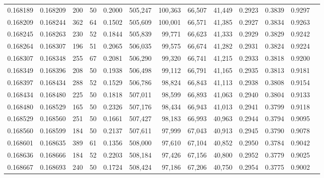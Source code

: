 \begin{tabular}{rrrrrrrrrrrrr}
0.168189 & 0.168209 &   200 &  50 &                                     0.2000 & 505,247 & 100,363 &  66,507 &  41,449 & 0.2923 & 0.3839 & 0.9297 \\
0.168209 & 0.168244 &   362 &  64 &                                     0.1502 & 505,609 & 100,001 &  66,571 &  41,385 & 0.2927 & 0.3834 & 0.9263 \\
0.168245 & 0.168263 &   230 &  52 &                                     0.1844 & 505,839 &  99,771 &  66,623 &  41,333 & 0.2929 & 0.3829 & 0.9242 \\
0.168264 & 0.168307 &   196 &  51 &                                     0.2065 & 506,035 &  99,575 &  66,674 &  41,282 & 0.2931 & 0.3824 & 0.9224 \\
0.168307 & 0.168348 &   255 &  67 &                                     0.2081 & 506,290 &  99,320 &  66,741 &  41,215 & 0.2933 & 0.3818 & 0.9200 \\
0.168349 & 0.168396 &   208 &  50 &                                     0.1938 & 506,498 &  99,112 &  66,791 &  41,165 & 0.2935 & 0.3813 & 0.9181 \\
0.168397 & 0.168434 &   288 &  52 &                                     0.1529 & 506,786 &  98,824 &  66,843 &  41,113 & 0.2938 & 0.3808 & 0.9154 \\
0.168434 & 0.168480 &   225 &  50 &                                     0.1818 & 507,011 &  98,599 &  66,893 &  41,063 & 0.2940 & 0.3804 & 0.9133 \\
0.168480 & 0.168529 &   165 &  50 &                                     0.2326 & 507,176 &  98,434 &  66,943 &  41,013 & 0.2941 & 0.3799 & 0.9118 \\
0.168529 & 0.168560 &   251 &  50 &                                     0.1661 & 507,427 &  98,183 &  66,993 &  40,963 & 0.2944 & 0.3794 & 0.9095 \\
0.168560 & 0.168599 &   184 &  50 &                                     0.2137 & 507,611 &  97,999 &  67,043 &  40,913 & 0.2945 & 0.3790 & 0.9078 \\
0.168601 & 0.168635 &   389 &  61 &                                     0.1356 & 508,000 &  97,610 &  67,104 &  40,852 & 0.2950 & 0.3784 & 0.9042 \\
0.168636 & 0.168666 &   184 &  52 &                                     0.2203 & 508,184 &  97,426 &  67,156 &  40,800 & 0.2952 & 0.3779 & 0.9025 \\
0.168667 & 0.168693 &   240 &  50 &                                     0.1724 & 508,424 &  97,186 &  67,206 &  40,750 & 0.2954 & 0.3775 & 0.9002 \\

\end{tabular}
